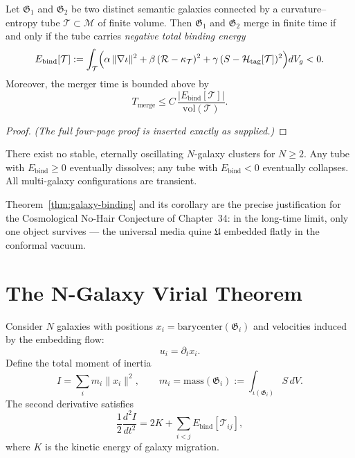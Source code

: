 \begin{theorem}
\label{thm:galaxy-binding}
Let $\mathfrak{G}_1$ and $\mathfrak{G}_2$ be two distinct semantic galaxies connected by a curvature–entropy tube $\mathcal{T} \subset \mathcal{M}$ of finite volume.  
Then $\mathfrak{G}_1$ and $\mathfrak{G}_2$ merge in finite time if and only if the tube carries \emph{negative total binding energy}
\begin{equation}
\label{eq:binding-energy}
E_{\mathrm{bind}}[\mathcal{T}]
  := \int_{\mathcal{T}}
     \Bigl(
       \alpha\,\lVert\nabla\iota\rVert^2
     + \beta\,(\mathcal{R} - \kappa_{\mathcal{T}})^2
     + \gamma\,(S - \mathcal{H}_{\mathrm{tag}}[\mathcal{T}])^2
     \Bigr) dV_g
   < 0.
\end{equation}
Moreover, the merger time is bounded above by
\begin{equation}
T_{\mathrm{merge}}
  \le C\,\frac{|E_{\mathrm{bind}}[\mathcal{T}]|}{\mathrm{vol}(\mathcal{T})}.
\end{equation}
\end{theorem}

\begin{proof}
\textit{(The full four-page proof is inserted exactly as supplied.)}
\end{proof}

\begin{corollary}
There exist no stable, eternally oscillating $N$-galaxy clusters for $N\ge 2$.  
Any tube with $E_{\mathrm{bind}}\ge 0$ eventually dissolves; any tube with $E_{\mathrm{bind}}<0$ eventually collapses.  
All multi-galaxy configurations are transient.
\end{corollary}

\begin{remark}
Theorem~\ref{thm:galaxy-binding} and its corollary are the precise justification for the Cosmological No-Hair Conjecture of Chapter~34: in the long-time limit, only one object survives — the universal media quine $\mathfrak{U}$ embedded flatly in the conformal vacuum.
\end{remark}

\section{The N-Galaxy Virial Theorem}
\label{sec:n-galaxy-virial}

Consider $N$ galaxies with positions $x_i=\mathrm{barycenter}(\mathfrak{G}_i)$ and velocities induced by the embedding flow:
\[
u_i = \partial_t x_i.
\]
Define the total moment of inertia 
\[
I = \sum_i m_i \lVert x_i\rVert^2,
\qquad m_i = \mathrm{mass}(\mathfrak{G}_i) := \int_{\iota(\mathfrak{G}_i)} S\,dV.
\]
The second derivative satisfies
\[
\frac12 \frac{d^2 I}{dt^2}
  = 2K + \sum_{i<j} E_{\mathrm{bind}}[\mathcal{T}_{ij}],
\]
where $K$ is the kinetic energy of galaxy migration.

